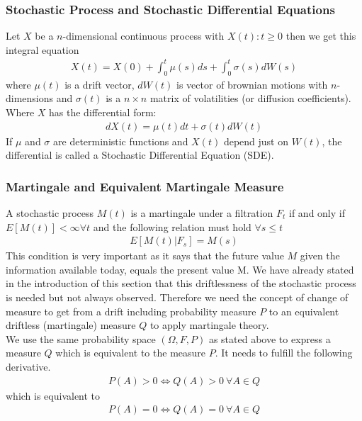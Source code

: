 \documentclass[11pt]{article}
\numberwithin{equation}{subsection}
\begin{document}
\subsubsection{Stochastic Process and Stochastic Differential Equations}
Let \(X\) be a \(n\)-dimensional continuous process with \(X(t): t \geq 0\) then we get this integral equation
\begin{eqnarray}
	X(t) = X(0) + \int_{0}^{t} \mu(s)ds + \int_{0}^{t} \sigma(s) dW(s)
\end{eqnarray}	
where \(\mu(t)\) is a drift vector, \(dW(t)\) is vector of brownian motions with \(n\)-dimensions and \(\sigma(t)\) is a \(n\times n\) matrix of volatilities (or diffusion coefficients). Where \(X\) has the differential form:
\begin{eqnarray}
	dX(t) = \mu(t)dt + \sigma(t) dW(t)
\end{eqnarray}	
If \(\mu\) and \(\sigma\) are deterministic functions and \(X(t)\) depend just on \(W(t)\), the differential is called a Stochastic Differential Equation (SDE).
\subsubsection{Martingale and Equivalent Martingale Measure}
A stochastic process \(M(t)\) is a martingale under a filtration \(F_t\) if and only if \(E[M(t)] < \infty \forall t\) and the following relation must hold \(\forall s \leq t\)
\begin{eqnarray}
	E[M(t)|F_s] = M(s)
\end{eqnarray}
This condition is very important as it says that the future value \(M\) given the information available today, equals the present value M. We have already stated in the introduction of this section that this driftlessness of the stochastic process is needed but not always observed. Therefore we need the concept of change of measure to get from a drift including probability measure \(P\) to an equivalent driftless (martingale) measure \(Q\) to apply martingale theory.\\
We use the same probability space \((\Omega, F, P)\) as stated above to express a measure \(Q\) which is equivalent to the measure \(P\). It needs to fulfill the following derivative.
\begin{eqnarray}
	P(A) > 0 \iff Q(A) > 0 \ \forall A \in Q 
\end{eqnarray}
which is equivalent to
\begin{eqnarray}
	P(A) = 0 \iff Q(A) = 0 \ \forall A \in Q 
\end{eqnarray}
\end{document}

